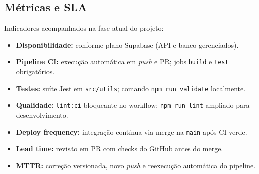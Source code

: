 \subsection{Métricas e SLA}

Indicadores acompanhados na fase atual do projeto:

\begin{itemize}
    \item \textbf{Disponibilidade:} conforme plano Supabase (API e banco gerenciados).
    \item \textbf{Pipeline CI:} execução automática em \textit{push} e PR; jobs \texttt{build} e \texttt{test} obrigatórios.
    \item \textbf{Testes:} suíte Jest em \texttt{src/utils}; comando \texttt{npm run validate} localmente.
    \item \textbf{Qualidade:} \texttt{lint:ci} bloqueante no workflow; \texttt{npm run lint} ampliado para desenvolvimento.
    \item \textbf{Deploy frequency:} integração contínua via merge na \texttt{main} após CI verde.
    \item \textbf{Lead time:} revisão em PR com checks do GitHub antes do merge.
    \item \textbf{MTTR:} correção versionada, novo \textit{push} e reexecução automática do pipeline.
\end{itemize}
